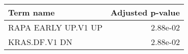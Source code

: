 \begin{tabular}{lr}
\toprule
          Term name &  Adjusted p-value \\
\midrule
RAPA EARLY UP.V1 UP &          2.88e-02 \\
      KRAS.DF.V1 DN &          2.88e-02 \\
\bottomrule
\end{tabular}

